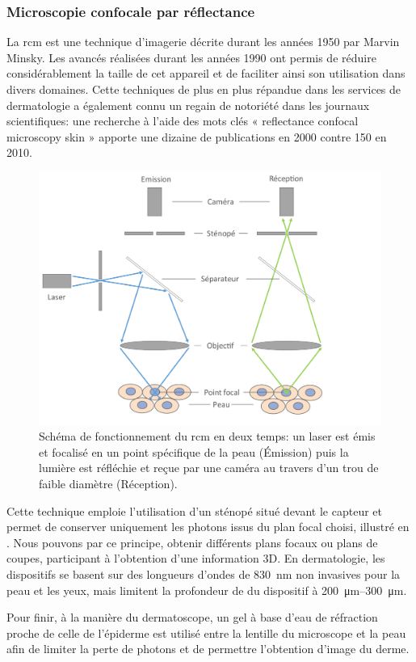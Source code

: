 \subsubsection{Microscopie confocale par réflectance}
La \gls{rcm} est une technique d’imagerie décrite durant les années 1950 par Marvin Minsky. Les avancés réalisées durant les années 1990 ont permis de réduire considérablement la taille de cet appareil et de faciliter ainsi son utilisation dans divers domaines. Cette techniques de plus en plus répandue dans les services de dermatologie a également connu un regain de notoriété dans les journaux scientifiques: une recherche à l’aide des mots clés « reflectance confocal microscopy skin » apporte une dizaine de publications en 2000 contre 150 en 2010.\par
\begin{figure}[H]
\centering
    \includegraphics[width=0.6\linewidth]{contents/chapter_2/resources/rcm_principle.pdf}
    \caption{Schéma de fonctionnement du \gls{rcm} en deux temps: un laser est émis et focalisé en un point spécifique de la peau (Émission) puis la lumière est réfléchie et reçue par une caméra au travers d'un trou de faible diamètre (Réception).}
    \label{fig:rcm_principle}
\end{figure}\par
Cette technique emploie l’utilisation d’un sténopé situé devant le capteur et permet de conserver uniquement les photons issus du plan focal choisi, illustré en . Nous pouvons par ce principe, obtenir différents plans focaux ou plans de coupes, participant à l’obtention d’une information 3D. En dermatologie, les dispositifs se basent sur des longueurs d’ondes de \SI{830}{\nano\metre} non invasives pour la peau et les yeux, mais limitent la profondeur de du dispositif à \SIrange{200}{300}{\micro\metre}.\par
Pour finir, à la manière du dermatoscope, un gel à base d’eau de réfraction proche de celle de l’épiderme est utilisé entre la lentille du microscope et la peau afin de limiter la perte de photons et de permettre l’obtention d’image du derme.\par

